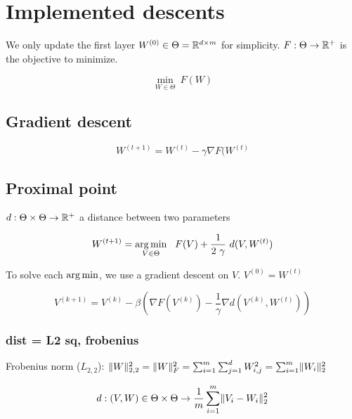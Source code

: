 \section{Implemented descents}

We only update the first layer $W^{(0)} \in \Theta = \mathbb{R}^{d \times m}$ for simplicity. $F : \Theta \rightarrow \mathbb{R}^+$ is the objective to minimize.

\begin{equation}
	\min_{W \in \Theta} \ F(W)
\end{equation}

\subsection{Gradient descent}

\begin{equation}
	W^{(t+1)} = W^{(t)} - \gamma \nabla F(W^{(t)}
\end{equation}

\subsection{Proximal point}

$d: \Theta \times \Theta \rightarrow \mathbb{R}^+$ a distance between two parameters

\begin{equation}
	W^{(t+1)} = \argmin_{V \in \Theta} \ \  F(V) + \frac{1}{2 ~ \gamma} ~ d(V, W^{(t)})
\end{equation}

To solve each $\operatorname*{arg\,min}$, we use a gradient descent on $V$. $V^{(0)} = W^{(t)}$

\begin{equation}
	V^{(k+1)} = V^{(k)} - \beta \left(\nabla F(V^{(k)}) - \frac{1}{\gamma} \nabla d(V^{(k)}, W^{(t)})\right)
\end{equation}

\subsubsection{dist = L2 sq, frobenius}

Frobenius norm ($L_{2,2}$): $\lVert W\rVert_{2,2}^2 = \lVert W\rVert_F^2 = \sum_{i=1}^{m} \sum_{j=1}^{d} W_{i, j}^2 = \sum_{i=1}^{m} \lVert W_i\rVert_2^2$

\begin{equation}
	d : (V, W) \in \Theta \times \Theta \rightarrow \frac{1}{m} \sum_{i=1}^{m} \lVert V_i - W_i\rVert^2_2
\end{equation}


